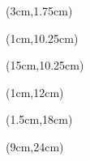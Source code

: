 \begin{titlepage}
    \thispagestyle{empty}

    

    \begin{textblock*}{15cm}(3cm,1.75cm)
        \begin{LARGE}
            \makeatletter
            \justifying
            \begin{center}
                \textbf{\textcolor{white}{\thetitle}}
            \end{center}
            \makeatother
        \end{LARGE}
    \end{textblock*}

    \begin{textblock*}{10cm}(1cm,10.25cm)
        \raggedright
        \makeatletter
        \Large
        \selectfont
        \textbf{
            \textcolor{white}{\theSemestre}
            }
        \makeatother
    \end{textblock*}

    \begin{textblock*}{5cm}(15cm,10.25cm)
        \raggedleft
        \makeatletter
        \Large
        \selectfont
        \textbf{
            \textcolor{white}{\theUE}
            }
        \makeatother
    \end{textblock*}


    \begin{textblock*}{18.5cm}(1cm,12cm)
        \LARGE
        \selectfont
        \begin{center}
            \textbf{\textcolor{bleuRoiUTT}{\titletext}}
        \end{center}
    \end{textblock*}

    \begin{textblock*}{18cm}(1.5cm,18cm)
        \centering
        \large
        \textbf{\textcolor{bleuRoiUTT}{\theauthor}}

    \end{textblock*}

    \begin{textblock*}{5cm}(9cm,24cm)
        \begin{Huge}
            \raggedleft
            \fontsize{14}{14}\textbf{\textcolor{bleuRoiUTT}{\thedate}}
            \makeatother
        \end{Huge}
    \end{textblock*}

\end{titlepage}

\clearpage %
